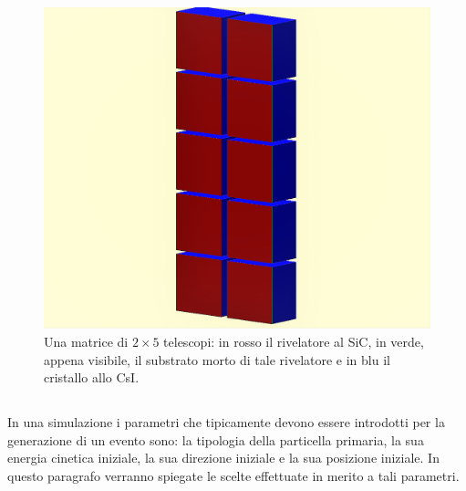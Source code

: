 \begin{figure} [!p]
	\centering
	\includegraphics[width=\textwidth, keepaspectratio]{Grafici/modulo2_ritagliato.png}
	\caption{Una matrice di $2 \times 5$ telescopi: in rosso il rivelatore al SiC, in verde, appena visibile, il substrato morto di tale rivelatore e in blu il cristallo allo CsI.} \label{fig:simulazione_muro}
\end{figure}


\subsection{} \label{par:particelle_primarie}

In una simulazione \geant{} i parametri che tipicamente devono essere introdotti per la generazione di un evento sono: la tipologia della particella primaria, la sua energia cinetica iniziale, la sua direzione iniziale e la sua posizione iniziale.
In questo paragrafo verranno spiegate le scelte effettuate in merito a tali parametri.

